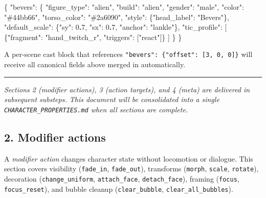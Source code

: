 \documentclass[
  12pt,
  letterpaper,
]{book}
\newenvironment{Shaded}{}{}
\newcommand{\DataTypeTok}[1]{\textcolor[rgb]{0.56,0.13,0.00}{#1}}
\newcommand{\DecValTok}[1]{\textcolor[rgb]{0.25,0.63,0.44}{#1}}
\newcommand{\ErrorTok}[1]{\textcolor[rgb]{1.00,0.00,0.00}{\textbf{#1}}}
\newcommand{\FunctionTok}[1]{\textcolor[rgb]{0.02,0.16,0.49}{#1}}
\newcommand{\OtherTok}[1]{\textcolor[rgb]{0.00,0.44,0.13}{#1}}
\newcommand{\StringTok}[1]{\textcolor[rgb]{0.25,0.44,0.63}{#1}}
\begin{document}
\begin{Shaded}
\begin{Highlighting}[]
\FunctionTok{\{}
  \DataTypeTok{"bevers"}\FunctionTok{:} \FunctionTok{\{}
    \DataTypeTok{"figure\_type"}\FunctionTok{:} \StringTok{"alien"}\FunctionTok{,}
    \DataTypeTok{"build"}\FunctionTok{:} \StringTok{"alien"}\FunctionTok{,}
    \DataTypeTok{"gender"}\FunctionTok{:} \StringTok{"male"}\FunctionTok{,}
    \DataTypeTok{"color"}\FunctionTok{:} \StringTok{"\#44bb66"}\FunctionTok{,}
    \DataTypeTok{"torso\_color"}\FunctionTok{:} \StringTok{"\#2a6090"}\FunctionTok{,}
    \DataTypeTok{"style"}\FunctionTok{:} \FunctionTok{\{}\DataTypeTok{"head\_label"}\FunctionTok{:} \StringTok{"Bevers"}\FunctionTok{\},}
    \DataTypeTok{"default\_scale"}\FunctionTok{:} \FunctionTok{\{}\DataTypeTok{"sy"}\FunctionTok{:} \DecValTok{0}\ErrorTok{.}\DecValTok{7}\FunctionTok{,} \DataTypeTok{"sx"}\FunctionTok{:} \DecValTok{0}\ErrorTok{.}\DecValTok{7}\FunctionTok{,} \DataTypeTok{"anchor"}\FunctionTok{:} \StringTok{"lankle"}\FunctionTok{\},}
    \DataTypeTok{"tic\_profile"}\FunctionTok{:} \OtherTok{[}
      \FunctionTok{\{}\DataTypeTok{"fragment"}\FunctionTok{:} \StringTok{"hand\_twitch\_r"}\FunctionTok{,} \DataTypeTok{"triggers"}\FunctionTok{:} \OtherTok{[}\StringTok{"react"}\OtherTok{]}\FunctionTok{\}}
    \OtherTok{]}
  \FunctionTok{\}}
\FunctionTok{\}}
\end{Highlighting}
\end{Shaded}

A per-scene cast block that references
\texttt{"bevers":\ \{"offset":\ {[}3,\ 0,\ 0{]}\}} will receive all
canonical fields above merged in automatically.

\begin{center}\rule{0.5\linewidth}{0.5pt}\end{center}

\emph{Sections 2 (modifier actions), 3 (action targets), and 4 (meta)
are delivered in subsequent substeps. This document will be consolidated
into a single \texttt{CHARACTER\_PROPERTIES.md} when all sections are
complete.}

\subsection{2. Modifier actions}\label{modifier-actions}

A \emph{modifier action} changes character state without locomotion or
dialogue. This section covers visibility (\texttt{fade\_in},
\texttt{fade\_out}), transforms (\texttt{morph}, \texttt{scale},
\texttt{rotate}), decoration (\texttt{change\_uniform},
\texttt{attach\_face}, \texttt{detach\_face}), framing (\texttt{focus},
\texttt{focus\_reset}), and bubble cleanup (\texttt{clear\_bubble},
\texttt{clear\_all\_bubbles}).
\end{document}
